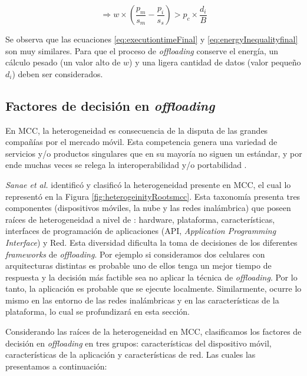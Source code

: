\begin{equation} \label{eq:energyInequalityfinal}
 \Rightarrow w \times \left(\frac{p_m}{s_m} - \frac{p_i}{s_s} \right) > p_c \times \frac{d_i}{B}
\end{equation}

Se observa que las ecuaciones \ref{eq:executiontimeFinal} y \ref{eq:energyInequalityfinal} son muy similares. Para que el proceso de \textit{offloading}
conserve el energía, un cálculo pesado (un valor alto de $w$) y una ligera cantidad de datos (valor pequeño $d_i$) deben ser considerados. 


\subsection{Factores de decisión en \textit{offloading} }
\label{sec:factors}

En MCC, la heterogeneidad es consecuencia de la disputa de las grandes compañías por el mercado móvil. Esta competencia 
genera una variedad de servicios y/o productos singulares que en su mayoría no siguen un estándar, y por ende muchas veces se relega la
interoperabilidad y/o portabilidad \cite{sanaei2014heterogeneity}.


\textit{Sanae et al.} \cite{sanaei2014heterogeneity} identificó y clasificó la heterogeneidad presente en MCC, el cual lo representó en 
la Figura \ref{fig:heterogeinityRootsmcc}. Esta taxonomía presenta tres componentes (dispositivos móviles, la nube y las redes inalámbrica) 
que poseen raíces de heterogeneidad a nivel de : hardware, plataforma, características, interfaces de programación de aplicaciones (API,
\textit{Application Programming Interface}) y Red. Esta diversidad dificulta la toma de decisiones de los diferentes \emph{frameworks} 
de \emph{offloading}. Por ejemplo si consideramos dos celulares con arquitecturas distintas es probable uno de ellos tenga un
mejor tiempo de respuesta y la decisión más factible sea no aplicar la técnica de \emph{offloading}. Por lo tanto, la aplicación es 
probable que se ejecute localmente.
Similarmente, ocurre lo mismo en las entorno de las redes inalámbricas y en las características de la plataforma, lo cual  se profundizará en esta sección.

Considerando las raíces de la heterogeneidad en MCC, clasificamos los factores de decisión en \textit{offloading}
en tres grupos: características del dispositivo móvil, características de la aplicación
y características de red. Las cuales las presentamos a continuación: 

